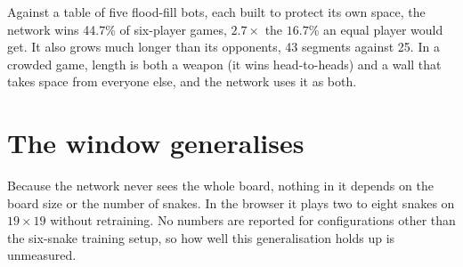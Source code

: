 \begin{keybox}
Against a table of five flood-fill bots, each built to protect its own space, the network
wins 44.7\% of six-player games, $2.7\times$ the $16.7\%$ an equal player would get. It
also grows much longer than its opponents, 43 segments against 25. In a crowded game,
length is both a weapon (it wins head-to-heads) and a wall that takes space from
everyone else, and the network uses it as both.
\end{keybox}

\section{The window generalises}

Because the network never sees the whole board, nothing in it depends on the board size
or the number of snakes. In the browser it plays two to eight snakes on $19\times19$
without retraining. No numbers are reported for configurations other than the
six-snake training setup, so how well this generalisation holds up is unmeasured.
